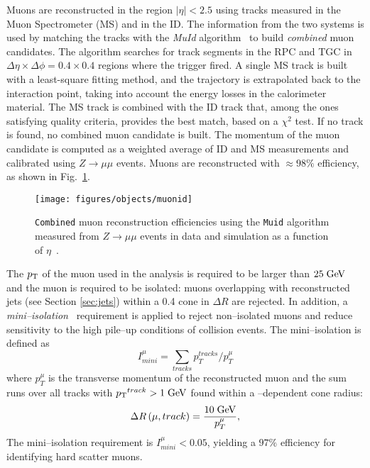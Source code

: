 Muons are reconstructed in the region $|\eta|<2.5$ using tracks
measured in the Muon Spectrometer (MS) and in the ID.
The information from the two systems is used by matching
the tracks with the {\it MuId} algorithm~\cite{muidalgo} to build 
{\it combined} muon candidates.
The algorithm searches for track segments in the RPC and TGC in
$\Delta\eta\times\Delta\phi=0.4\times0.4$ regions where the trigger
fired. A single MS track is built with a least-square fitting method, and
the trajectory is extrapolated back to the interaction point, taking
into account the energy losses in the calorimeter material. 
The MS track is combined with the ID track that, among the ones
satisfying quality criteria, provides the best match, based on a
$\chi^2$ test. If no track is found, no combined muon candidate is built.
The momentum of the muon candidate is computed as a weighted average
of ID and MS measurements and calibrated using $Z\to \mu\mu$ events.
Muons are reconstructed with \mbox{$\approx{}98\%$} efficiency, as shown in
Fig.~\ref{fig:mueff}.

\begin{figure}[htb!]\centering
  \texttt{[image: figures/objects/muonid]}
  \caption{\texttt{Combined} muon reconstruction efficiencies using
    the \texttt{Muid} algorithm measured from $Z\to \mu\mu$ events in
    data and simulation as a function of
    $\eta$~\cite{miniisolation}.} 
  \label{fig:mueff}
\end{figure}

The $p_{\mathrm{T}}$ of the muon used in the analysis is required to be larger
than \mbox{$25 \; \mathrm{GeV}{}$} and the muon is required to be isolated: muons
overlapping with reconstructed jets (see Section \ref{sec:jets})
within a 0.4 cone in $\Delta R$ are rejected. In addition, a {\it
  mini--isolation}~\cite{miniisolation} requirement is applied to
reject non--isolated muons and reduce sensitivity to the high pile--up
conditions of \eighttev{} collision events. The mini--isolation is
defined as
\begin{equation}
I^{\mu}_{mini}=\sum_{tracks}p_T^{tracks}/p_T^{\mu}
\end{equation}
where $p_T^{\mu}$ is the transverse momentum of the reconstructed muon
and the sum runs over all tracks with $p_{\mathrm{T}}{}^{track}>1\; \mathrm{GeV}$ found within a \pt{}--dependent cone
radius:
\begin{equation}
\Delta{}R\left(\mu, track\right)=\frac{10\; \mathrm{GeV}}{p_T^{\mu}},
\end{equation}
The mini--isolation requirement is $I^{\mu}_{mini}<0.05$, yielding
a $97\%$ efficiency for identifying hard scatter muons.

